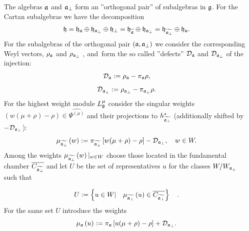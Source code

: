 \documentclass[12pt]{iopart}
\theoremstyle{definition}
\begin{document}
The algebras $\frak{a}$ and $\frak{a}_{\perp }$ form an ''orthogonal pair''
of subalgebras in $\frak{g}$. For the Cartan subalgebras we have the
decomposition
\begin{equation}
\frak{h}=\frak{\frak{h}_{\frak{a}}}\oplus \frak{h}_{\frak{a}_{\perp }}\oplus
\frak{h}_{\perp }=\frak{\frak{h}_{\widetilde{\frak{a}}}}\oplus \frak{h}_{%
\frak{a}_{\perp }}=\frak{\frak{h}_{\widetilde{\frak{a}_{\perp }}}}\oplus
\frak{h}_{\frak{a}}.
\end{equation}
For the subalgebras of the orthogonal pair $\left( \frak{a},\frak{a}_{\perp
}\right) $ we consider the corresponding Weyl vectors, $\rho _{\frak{a}}$
and $\rho _{\frak{a}_{\perp }}$ , and\ form the so called ''defects'' $%
\mathcal{D}_{\frak{a}}$ and $\mathcal{D}_{\frak{a}_{\perp }}$ of the
injection:
\begin{equation}
\mathcal{D}_{\frak{a}}:=\rho _{\frak{a}}-\pi _{\frak{a}}\rho ,
\end{equation}
\begin{equation}
\mathcal{D}_{\frak{a}_{\perp }}:=\rho _{\frak{a}_{\perp }}-\pi _{\frak{a}%
_{\perp }}\rho .
\end{equation}
For the highest weight module $L_{\frak{g}}^{\mu }$ consider the singular
weights $\left( w(\mu +\rho )-\rho \right) \in \widehat{\Psi ^{\left( \mu
\right) }}$ and their projections to $h_{\widetilde{\frak{a}_{\perp }}%
}^{\ast }$ (additionally shifted by $-\mathcal{D}_{\frak{a}_{\perp }}$):
\begin{equation*}
\mu _{\widetilde{\frak{a}_{\perp }}}\left( w\right) :=\pi _{\widetilde{\frak{%
a}_{\perp }}}\left[ w(\mu +\rho )-\rho \right] -\mathcal{D}_{\frak{a}_{\perp
}},\quad w\in W.
\end{equation*}
Among the weights $\mu _{\widetilde{\frak{a}_{\perp }}}\left( w\right)
|_{w\in W}$ choose those located in the fundamental chamber $\overline{C_{%
\widetilde{\frak{a}_{\perp }}}}$ and let $U$ be the set of representatives $%
u $ for the classes $W/W_{\frak{a}_{\perp }}$ such that

\begin{equation}
U:=\left\{ u\in W|\quad \mu _{\widetilde{\frak{a}_{\perp }}}\left( u\right)
\in \overline{C_{\widetilde{\frak{a}_{\perp }}}}\right\} \quad .
\label{U-def}
\end{equation}
For the same set $U$ introduce the weights
\begin{equation*}
\mu _{\frak{a}}\left( u\right) :=\pi _{\frak{a}}\left[ u(\mu +\rho )-\rho %
\right] +\mathcal{D}_{\frak{a}_{\perp }}.
\end{equation*}
\end{document}
